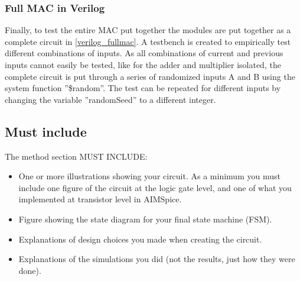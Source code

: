 \subsubsection{Full MAC in Verilog}
\label{subsubsec_FullFSM_verilog}

Finally, to test the entire MAC put together the modules are put together as a complete circuit in \autoref{verilog_fullmac}. A testbench is created to empirically test different combinations of inputs. As all combinations of current and previous inputs cannot easily be tested, like for the adder and multiplier isolated, the complete circuit is put through a series of randomized inputs A and B using the system function ''\$random''. The test can be repeated for different inputs by changing the variable ''randomSeed'' to a different integer.


\subsection{Must include}
The method section MUST INCLUDE:
\begin{itemize}
    \item One or more illustrations showing your circuit. As a minimum you must include one figure of the circuit at the logic gate level, and one of what you implemented at transistor level in AIMSpice.
    \item Figure showing the state diagram for your final state machine (FSM).
    \item Explanations of design choices you made when creating the circuit.
    \item Explanations of the simulations you did (not the results, just how they were done).
\end{itemize}